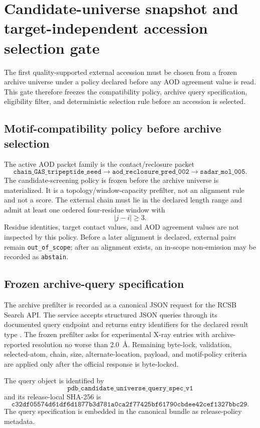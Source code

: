 \section{Candidate-universe snapshot and target-independent accession selection gate}

The first quality-supported external accession must be chosen from a frozen archive universe under a policy declared before any AOD agreement value is read. This gate therefore freezes the compatibility policy, archive query specification, eligibility filter, and deterministic selection rule before an accession is selected.

\subsection{Motif-compatibility policy before archive selection}

The active AOD packet family is the contact/reclosure packet
\[
\texttt{chain\_GAS\_tripeptide\_seed}
\longrightarrow
\texttt{aod\_reclosure\_pred\_002}
\longrightarrow
\texttt{sadar\_mol\_005}.
\]
The candidate-screening policy is frozen before the archive universe is materialized. It is a topology/window-capacity prefilter, not an alignment rule and not a score. The external chain must lie in the declared length range and admit at least one ordered four-residue window with
\[
|j-i|\ge 3.
\]
Residue identities, target contact values, and AOD agreement values are not inspected by this policy. Before a later alignment is declared, external pairs remain \texttt{out\_of\_scope}; after an alignment exists, an in-scope non-emission may be recorded as \texttt{abstain}.

\subsection{Frozen archive-query specification}

The archive prefilter is recorded as a canonical JSON request for the RCSB Search API. The service accepts structured JSON queries through its documented query endpoint and returns entry identifiers for the declared result type \cite{rcsbSearchAPI}. The frozen prefilter asks for experimental X-ray entries with archive-reported resolution no worse than 2.0~\AA. Remaining byte-lock, validation, selected-atom, chain, size, alternate-location, payload, and motif-policy criteria are applied only after the official response is byte-locked.

The query object is identified by
\[
\texttt{pdb\_candidate\_universe\_query\_spec\_v1}
\]
and its release-local SHA-256 is
\[
\texttt{c32df05574d61df6d1877b3d781a0ca2f77425bf61790cbdee42cef1327bbc29}.
\]
The query specification is embedded in the canonical bundle as release-policy metadata.

